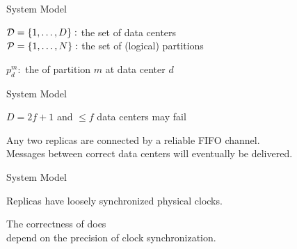 
\begin{frame}{System Model}
  \begin{center}
    $\mathcal{D} = \{1, \dots, D\}:$ the set of data centers \\[3pt]

    $\mathcal{P} = \{1, \dots, N\}:$ the set of (logical) partitions


    $p^{m}_{d}:$ the  of partition $m$ at data center $d$
  \end{center}
\end{frame}

\begin{frame}{System Model}
  \begin{center}
    $D = 2f + 1$ and $\le f$ data centers may fail


    Any two replicas are connected by a reliable FIFO channel. \\[3pt]
    Messages between correct data centers will eventually be delivered.
  \end{center}
\end{frame}

\begin{frame}{System Model}
  \begin{center}
    Replicas have loosely synchronized physical clocks.

    \vspace{0.20cm}

    \vspace{0.20cm}
    The correctness of \unistore{} does  \\[3pt]
    depend on the precision of clock synchronization.
  \end{center}
\end{frame}
